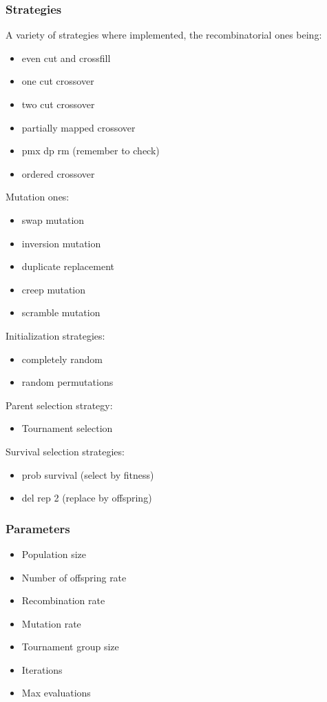 \documentclass{scrartcl}
\begin{document}
\subsubsection{Strategies}
A variety of strategies where implemented, the recombinatorial ones being:
\begin{itemize}
    \item even cut and crossfill
    \item one cut crossover
    \item two cut crossover
    \item partially mapped crossover
    \item pmx dp rm (remember to check)
    \item ordered crossover
\end{itemize}
Mutation ones:
\begin{itemize}
    \item swap mutation
    \item inversion mutation
    \item duplicate replacement
    \item creep mutation
    \item scramble mutation
\end{itemize}
Initialization strategies:
\begin{itemize}
    \item completely random
    \item random permutations
\end{itemize}
Parent selection strategy:
\begin{itemize}
    \item Tournament selection
\end{itemize}
Survival selection strategies:
\begin{itemize}
    \item prob survival (select by fitness)
    \item del rep 2 (replace by offspring)
\end{itemize}
\subsubsection{Parameters}
\begin{itemize}
    \item Population size
    \item Number of offspring rate
    \item Recombination rate
    \item Mutation rate
    \item Tournament group size
    \item Iterations
    \item Max evaluations
\end{itemize}
\end{document}
